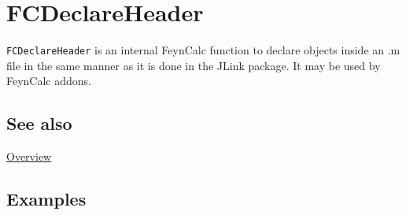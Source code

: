 \documentclass[../FeynCalcManual.tex]{subfiles}
\begin{document}
\hypertarget{fcdeclareheader}{
\section{FCDeclareHeader}\label{fcdeclareheader}}

\texttt{FCDeclareHeader} is an internal FeynCalc function to declare
objects inside an .m file in the same manner as it is done in the JLink
package. It may be used by FeynCalc addons.

\subsection{See also}

\hyperlink{toc}{Overview}

\subsection{Examples}
\end{document}

